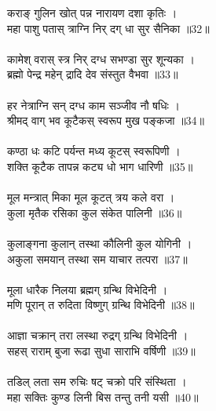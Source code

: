 कराङ् गुलिन खोत् पन्न नारायण दशा कृतिः ।\\
महा पाशु पतास् त्राग्नि निर् दग् धा सुर सैनिका ॥32॥\\
\\
कामेश् वरास् स्त्र निर् दग्ध सभण्डा सुर शून्यका ।\\
ब्रह्मो पेन्द्र महेन् द्रादि देव संस्तुत वैभवा ॥33॥\\
\\
हर नेत्राग्नि सन् दग्ध काम सञ्जीव नौ षधिः ।\\
श्रीमद् वाग् भव कूटैकस् स्वरूप मुख पङ्कजा ॥34॥\\
\\
कण्ठा धः कटि पर्यन्त मध्य कूटस् स्वरूपिणी ।\\
शक्ति कूटैक तापन्न कट्य धो भाग धारिणी ॥35॥\\
\\
मूल मन्त्रात् मिका मूल कूटत् त्रय कले वरा ।\\
कुला मृतैक रसिका कुल संकेत पालिनी ॥36॥\\
\\
कुलाङ्गना कुलान् तस्था कौलिनी कुल योगिनी ।\\
अकुला समयान् तस्था सम याचार तत्परा ॥37॥\\
\\
मूला धारैक निलया ब्रह्मग् ग्रन्थि विभेदिनी ।\\
मणि पूरान् त रुदिता विष्णुग् ग्रन्थि विभेदिनी ॥38॥\\
\\
आज्ञा चक्रान् तरा लस्था रुद्रग् ग्रन्थि विभेदिनी ।\\
सहस् राराम् बुजा रूढा सुधा साराभि वर्षिणी ॥39॥\\
\\
तडिल् लता सम रुचिः षट् चक्रो परि संस्थिता ।\\
महा सक्तिः कुण्ड लिनी बिस तन्तु तनी यसी ॥40॥\\
